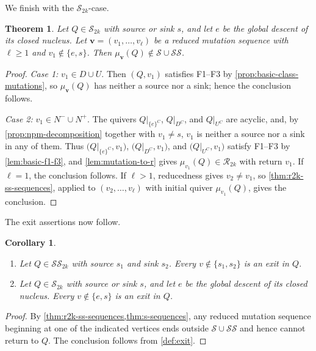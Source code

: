 \documentclass[10pt,a4paper]{amsart}
\newtheorem{theorem}{Theorem}[section]
\newtheorem{corollary}[corollary]{Corollary}
\theoremstyle{definition}
\theoremstyle{definition}
\numberwithin{equation}{section}
\numberwithin{table}{section}
\newcommand{\nminus}{N^{-}}
\newcommand{\nplus}{N^{+}}
\newcommand{\Rclass}{\mathcal{R}}
\newcommand{\SSclass}{\mathcal{SS}}
\newcommand{\Sclass}{\mathcal{S}}
\begin{document}
We finish with the $\Sclass_{2k}$-case.

\begin{theorem}\label{thm:s-sequences}
Let $Q\in\Sclass_{2k}$ with source or sink $s$, and let $e$ be
the global descent of its closed nucleus. Let
$\mathbf v=(v_1,\ldots,v_\ell)$ be a reduced mutation sequence with
$\ell\ge1$ and $v_1\notin\{e,s\}$. Then
$\mu_{\mathbf v}(Q)\notin\Sclass\cup\SSclass$.
\end{theorem}

\begin{proof}\leavevmode\par
\emph{Case 1:} $v_1\in D\cup U$.
Then $(Q,v_1)$ satisfies F1--F3 by
\cref{prop:basic-class-mutations}, so $\mu_{\mathbf v}(Q)$ has neither a source
nor a sink; hence the conclusion follows.

\emph{Case 2:} $v_1\in\nminus\cup\nplus$.
The quivers $Q|_{\{e\}^C}$, $Q|_{D^C}$, and
$Q|_{U^C}$ are acyclic, and, by \cref{prop:npm-decomposition} together with
$v_1\ne s$, $v_1$ is neither a source nor a sink in any of them. Thus
$\bigl(Q|_{\{e\}^C},v_1\bigr)$, $\bigl(Q|_{D^C},v_1\bigr)$, and
$\bigl(Q|_{U^C},v_1\bigr)$ satisfy F1--F3 by
\cref{lem:basic-f1-f3}, and
\cref{lem:mutation-to-r} gives
$\mu_{v_1}(Q)\in\Rclass_{2k}$ with return $v_1$.
If $\ell=1$, the conclusion follows. If $\ell>1$, reducedness gives
$v_2\ne v_1$, so \cref{thm:r2k-ss-sequences}, applied to
$(v_2,\ldots,v_\ell)$ with initial quiver $\mu_{v_1}(Q)$, gives the conclusion.
\end{proof}

The exit assertions now follow.

\begin{corollary}\label{cor:status-exits}
\begin{enumerate}[label=\textup{(\roman*)},leftmargin=2.4em,itemsep=4pt]
\item Let $Q\in\SSclass_{2k}$ with source $s_1$ and sink $s_2$.
Every $v\notin\{s_1,s_2\}$ is an exit in $Q$.
\item Let $Q\in\Sclass_{2k}$ with source or sink $s$, and let $e$ be the
global descent of its closed nucleus.
Every $v\notin\{e,s\}$ is an exit in $Q$.
\end{enumerate}
\end{corollary}

\begin{proof}
By \cref{thm:r2k-ss-sequences,thm:s-sequences}, any reduced mutation
sequence beginning at one of the indicated vertices ends outside
$\Sclass\cup\SSclass$ and hence cannot return to $Q$.
The conclusion follows from \cref{def:exit}.
\end{proof}
\end{document}
